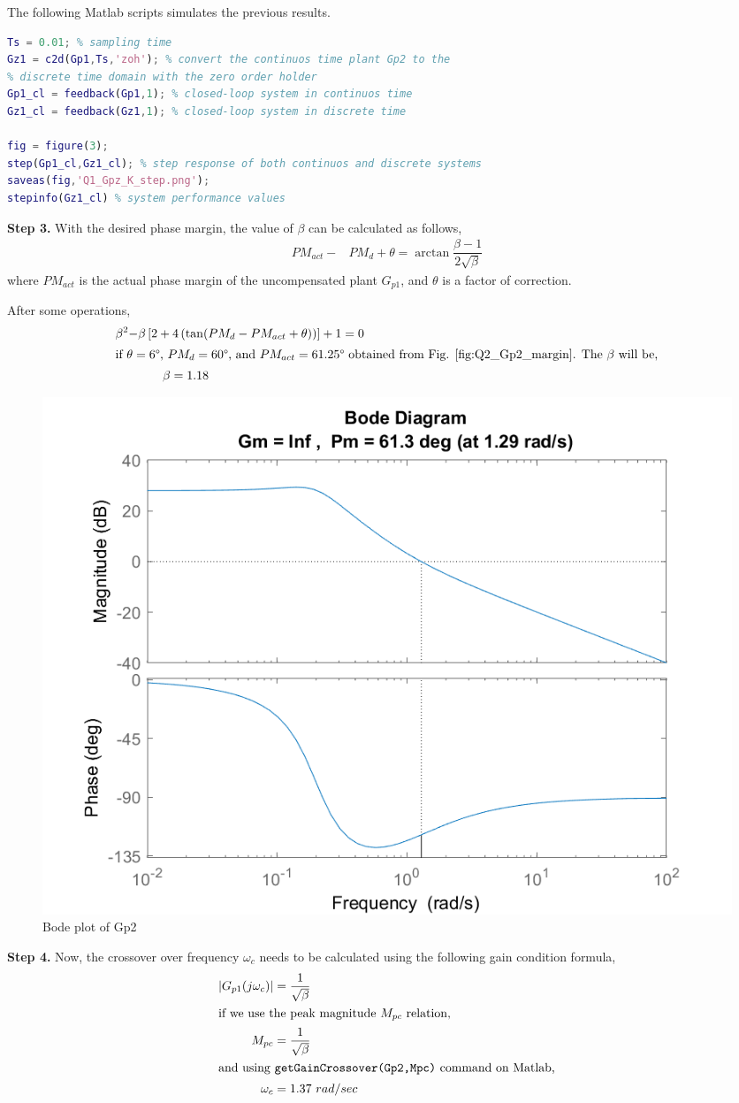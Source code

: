 \documentclass[11pt, a4paper]{article}
\begin{document}
The following Matlab scripts simulates the previous results.
\begin{lstlisting}[language=matlab, caption={}, label={}]
%% Digital uncompensated system with the new gain K
Ts = 0.01; % sampling time
Gz1 = c2d(Gp1,Ts,'zoh'); % convert the continuos time plant Gp2 to the
% discrete time domain with the zero order holder
Gp1_cl = feedback(Gp1,1); % closed-loop system in continuos time
Gz1_cl = feedback(Gz1,1); % closed-loop system in discrete time

fig = figure(3);
step(Gp1_cl,Gz1_cl); % step response of both continuos and discrete systems
saveas(fig,'Q1_Gpz_K_step.png');
stepinfo(Gz1_cl) % system performance values
\end{lstlisting}

\textbf{Step 3.} With the desired phase margin, the value of $\beta$ can be calculated as follows,
\begin{align}
PM_{act}- & PM_d+\theta = \arctan\dfrac{\beta-1}{2\sqrt{\beta}}
\end{align}
where $PM_{act}$ is the actual phase margin of the uncompensated plant $G_{p1}$, and $\theta$ is a factor of correction.

After some operations,
\begin{align}
\beta^2- & \beta\left[2+4\left(\tan(PM_d-PM_{act}+\theta)\right)\right] +1 = 0 \nonumber\\
\intertext{if $\theta=6\degree$, $PM_d=60\degree$, and $PM_{act}=61.25\degree$ obtained from Fig. \ref{fig:Q2_Gp2_margin}. The $\beta$ will be,}
&\qquad \beta = 1.18 \nonumber
\end{align}

\begin{figure}[H]
	\centering
	\includegraphics[width=0.48\linewidth]{../Q1_Gp2_margin.png}
	\caption{Bode plot of Gp2}
	\label{fig:Q2_Gp2_margin}
\end{figure}


\textbf{Step 4.} Now, the  crossover over frequency $\omega_c$ needs to be calculated using the following gain condition formula,
\begin{align}
\left| G_{p1}(j\omega_c) \right| &= \dfrac{1}{\sqrt{\beta}} \\
\intertext{if we use the peak magnitude $M_{pc}$ relation,}
M_{pc} &= \dfrac{1}{\sqrt{\beta}} \\
\intertext{and using \texttt{getGainCrossover(Gp2,Mpc)} command on Matlab,}
\omega_c& = 1.37 ~rad/sec \nonumber
\end{align}
\end{document}
